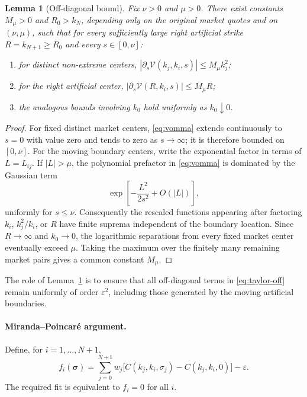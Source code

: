 \documentclass[11pt]{article}
\newtheorem{lemma}[theorem]{Lemma}
\newcommand{\eps}{\varepsilon}
\newcommand{\Vega}{\mathcal{V}}
\begin{document}
\begin{lemma}[Off-diagonal bound]\label{lem:vomma-bound}
Fix $\nu>0$ and $\mu>0$. There exist constants $M_\mu>0$ and $R_0>k_N$, depending only on the original market quotes and on $(\nu,\mu)$, such that for every sufficiently large right artificial strike $R=k_{N+1}\ge R_0$ and every $s\in[0,\nu]$:
\begin{enumerate}[label=(\roman*)]
\item for distinct non-extreme centers, $|\partial_s\Vega(k_j,k_i,s)|\le M_\mu k_j^2$;
\item for the right artificial center, $|\partial_s\Vega(R,k_i,s)|\le M_\mu R$;
\item the analogous bounds involving $k_0$ hold uniformly as $k_0\downarrow0$.
\end{enumerate}
\end{lemma}

\begin{proof}
For fixed distinct market centers, \eqref{eq:vomma} extends continuously to $s=0$ with value zero and tends to zero as $s\to\infty$; it is therefore bounded on $[0,\nu]$. For the moving boundary centers, write the exponential factor in terms of $L=L_{ij}$. If $|L|>\mu$, the polynomial prefactor in \eqref{eq:vomma} is dominated by the Gaussian term
\[
\exp\!\left[-\frac{L^2}{2s^2}+O(|L|)\right],
\]
uniformly for $s\le\nu$. Consequently the rescaled functions appearing after factoring $k_i$, $k_j^2/k_i$, or $R$ have finite suprema independent of the boundary location. Since $R\to\infty$ and $k_0\to0$, the logarithmic separations from every fixed market center eventually exceed $\mu$. Taking the maximum over the finitely many remaining market pairs gives a common constant $M_\mu$.
\end{proof}

The role of Lemma~\ref{lem:vomma-bound} is to ensure that all off-diagonal terms in \eqref{eq:taylor-off} remain uniformly of order $\eps^2$, including those generated by the moving artificial boundaries.

\paragraph{Miranda--Poincar\'e argument.}
Define, for $i=1,\ldots,N+1$,
\begin{equation}
f_i(\bm\sigma)=
\sum_{j=0}^{N+1}w_j
\bigl[C(k_j,k_i,\sigma_j)-C(k_j,k_i,0)\bigr]-\eps.
\label{eq:fi}
\end{equation}
The required fit is equivalent to $f_i=0$ for all $i$.
\end{document}
